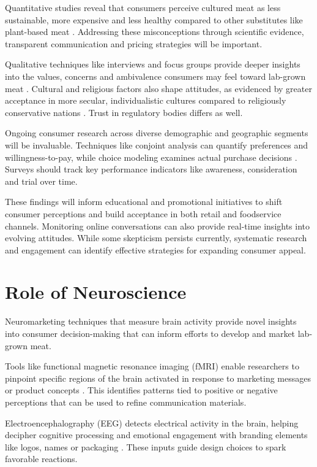 \documentclass[10pt]{article}
\begin{document}
\begin{sloppypar}
  Quantitative studies reveal that consumers perceive cultured meat as less sustainable, more expensive and less healthy compared to other substitutes like plant-based meat \citep{bryant_consumer_2018}. Addressing these misconceptions through scientific evidence, transparent communication and pricing strategies will be important.

  Qualitative techniques like interviews and focus groups provide deeper insights into the values, concerns and ambivalence consumers may feel toward lab-grown meat \citep{laestadius_is_2015}. Cultural and religious factors also shape attitudes, as evidenced by greater acceptance in more secular, individualistic cultures compared to religiously conservative nations \citep{wilks_attitudes_2017}. Trust in regulatory bodies differs as well.

  Ongoing consumer research across diverse demographic and geographic segments will be invaluable. Techniques like conjoint analysis can quantify preferences and willingness-to-pay, while choice modeling examines actual purchase decisions \citep{wilks_attitudes_2017}. Surveys should track key performance indicators like awareness, consideration and trial over time.

  These findings will inform educational and promotional initiatives to shift consumer perceptions and build acceptance in both retail and foodservice channels. Monitoring online conversations can also provide real-time insights into evolving attitudes. While some skepticism persists currently, systematic research and engagement can identify effective strategies for expanding consumer appeal.

  \section{Role of Neuroscience}
  \label{sec:role-of-neuroscience}

  Neuromarketing techniques that measure brain activity provide novel insights into consumer decision-making that can inform efforts to develop and market lab-grown meat.

  Tools like functional magnetic resonance imaging (fMRI) enable researchers to pinpoint specific regions of the brain activated in response to marketing messages or product concepts \citep{bryant_consumer_2018}. This identifies patterns tied to positive or negative perceptions that can be used to refine communication materials.

  Electroencephalography (EEG) detects electrical activity in the brain, helping decipher cognitive processing and emotional engagement with branding elements like logos, names or packaging \citep{khushaba_consumer_2013}. These inputs guide design choices to spark favorable reactions.


\end{sloppypar}
\end{document}

